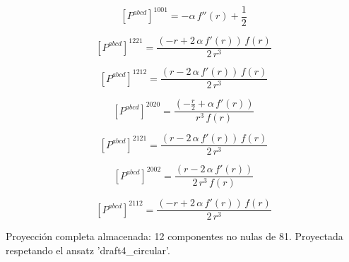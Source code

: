 \documentclass[11pt]{article}
\begin{document}
\begin{dmath*}[breakdepth={5}]
\left[P^{abcd}\right]^{1001} = -\alpha\,f''\!\left(r\right) + \frac{1}{2}
\end{dmath*}
\par\smallskip
\begin{dmath*}[breakdepth={5}]
\left[P^{abcd}\right]^{1221} = \frac{\left(-r + 2\,\alpha\,f'\!\left(r\right)\right)\,f\!\left(r\right)}{2\,{r}^{3}}
\end{dmath*}
\par\smallskip
\begin{dmath*}[breakdepth={5}]
\left[P^{abcd}\right]^{1212} = \frac{\left(r - 2\,\alpha\,f'\!\left(r\right)\right)\,f\!\left(r\right)}{2\,{r}^{3}}
\end{dmath*}
\par\smallskip
\begin{dmath*}[breakdepth={5}]
\left[P^{abcd}\right]^{2020} = \frac{\left(-\frac{r}{2} + \alpha\,f'\!\left(r\right)\right)}{{r}^{3}\,f\!\left(r\right)}
\end{dmath*}
\par\smallskip
\begin{dmath*}[breakdepth={5}]
\left[P^{abcd}\right]^{2121} = \frac{\left(r - 2\,\alpha\,f'\!\left(r\right)\right)\,f\!\left(r\right)}{2\,{r}^{3}}
\end{dmath*}
\par\smallskip
\begin{dmath*}[breakdepth={5}]
\left[P^{abcd}\right]^{2002} = \frac{\left(r - 2\,\alpha\,f'\!\left(r\right)\right)}{2\,{r}^{3}\,f\!\left(r\right)}
\end{dmath*}
\par\smallskip
\begin{dmath*}[breakdepth={5}]
\left[P^{abcd}\right]^{2112} = \frac{\left(-r + 2\,\alpha\,f'\!\left(r\right)\right)\,f\!\left(r\right)}{2\,{r}^{3}}
\end{dmath*}
\par\smallskip
Proyección completa almacenada: 12 componentes no nulas de 81. Proyectada respetando el ansatz 'draft4\_circular'.\par\medskip
{}
\end{document}
